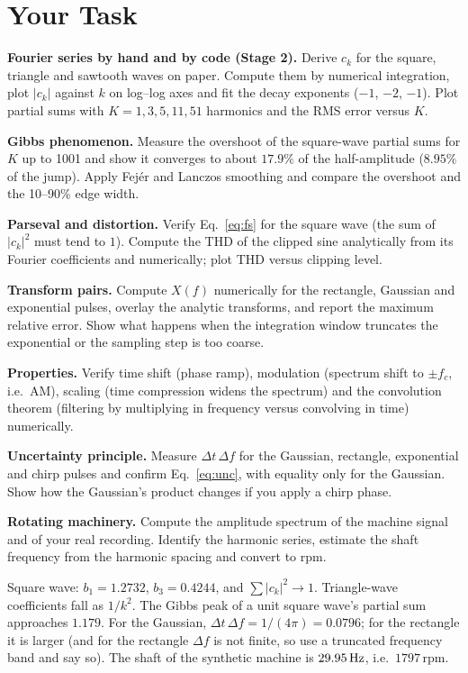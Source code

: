 \documentclass[11pt,a4paper]{article}
\begin{document}
\section*{Your Task}
\begin{tasks}
  \item \textbf{Fourier series by hand and by code (Stage 2).} Derive $c_k$ for the square, triangle and sawtooth waves on paper. Compute them by numerical integration, plot $|c_k|$ against $k$ on log--log axes and fit the decay exponents ($-1$, $-2$, $-1$). Plot partial sums with $K=1,3,5,11,51$ harmonics and the RMS error versus $K$.
  \item \textbf{Gibbs phenomenon.} Measure the overshoot of the square-wave partial sums for $K$ up to 1001 and show it converges to about $17.9\%$ of the half-amplitude ($8.95\%$ of the jump). Apply Fej\'er and Lanczos smoothing and compare the overshoot and the 10--90\% edge width.
  \item \textbf{Parseval and distortion.} Verify Eq.~\eqref{eq:fs} for the square wave (the sum of $|c_k|^2$ must tend to $1$). Compute the THD of the clipped sine analytically from its Fourier coefficients and numerically; plot THD versus clipping level.
  \item \textbf{Transform pairs.} Compute $X(f)$ numerically for the rectangle, Gaussian and exponential pulses, overlay the analytic transforms, and report the maximum relative error. Show what happens when the integration window truncates the exponential or the sampling step is too coarse.
  \item \textbf{Properties.} Verify time shift (phase ramp), modulation (spectrum shift to $\pm f_c$, i.e.\ AM), scaling (time compression widens the spectrum) and the convolution theorem (filtering by multiplying in frequency versus convolving in time) numerically.
  \item \textbf{Uncertainty principle.} Measure $\Delta t\,\Delta f$ for the Gaussian, rectangle, exponential and chirp pulses and confirm Eq.~\eqref{eq:unc}, with equality only for the Gaussian. Show how the Gaussian's product changes if you apply a chirp phase.
  \item \textbf{Rotating machinery.} Compute the amplitude spectrum of the machine signal and of your real recording. Identify the harmonic series, estimate the shaft frequency from the harmonic spacing and convert to rpm.
\end{tasks}

\begin{checkpoint}
Square wave: $b_1=1.2732$, $b_3=0.4244$, and $\sum|c_k|^2\to1$. Triangle-wave coefficients fall as $1/k^2$. The Gibbs peak of a unit square wave's partial sum approaches $1.179$. For the Gaussian, $\Delta t\,\Delta f=1/(4\pi)=0.0796$; for the rectangle it is larger (and for the rectangle $\Delta f$ is not finite, so use a truncated frequency band and say so). The shaft of the synthetic machine is $\SI{29.95}{\hertz}$, i.e.\ $1797\,\mathrm{rpm}$.
\end{checkpoint}
\end{document}

